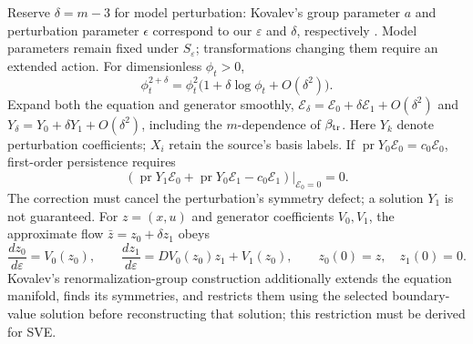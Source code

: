 \documentclass[11pt]{article}
\newcommand{\E}{\mathcal E}
\newcommand{\pr}{\operatorname{pr}}
\begin{document}
Reserve $\delta=m-3$ for model perturbation: Kovalev's group parameter $a$
and perturbation parameter $\epsilon$ correspond to our $\varepsilon$ and
$\delta$, respectively \cite{kovalev}. Model parameters remain fixed under
$S_\varepsilon$; transformations changing them require an extended action.
For dimensionless $\phi_t>0$,
\begin{equation}
\phi_t^{2+\delta}=\phi_t^2\bigl(1+\delta\log\phi_t+O(\delta^2)\bigr).
\end{equation}
Expand both the equation and generator smoothly,
$\E_\delta=\E_0+\delta\E_1+O(\delta^2)$ and
$Y_\delta=Y_0+\delta Y_1+O(\delta^2)$, including the $m$-dependence of
$\beta_{\rm tr}$.
Here $Y_k$ denote perturbation coefficients; $X_i$ retain the source's basis labels.
If $\pr Y_0\E_0=c_0\E_0$, first-order persistence requires
\begin{equation}
\left.(\pr Y_1\E_0+\pr Y_0\E_1-c_0\E_1)\right|_{\E_0=0}=0.
\end{equation}
The correction must cancel the perturbation's symmetry defect; a solution
$Y_1$ is not guaranteed. For $z=(x,u)$ and generator coefficients
$V_0,V_1$, the approximate flow $\bar z=z_0+\delta z_1$ obeys
\begin{equation}
\frac{dz_0}{d\varepsilon}=V_0(z_0),\qquad
\frac{dz_1}{d\varepsilon}=DV_0(z_0)z_1+V_1(z_0),\qquad
z_0(0)=z,\quad z_1(0)=0.
\end{equation}
Kovalev's renormalization-group construction additionally extends the
equation manifold, finds its symmetries, and restricts them using the selected
boundary-value solution before reconstructing that solution; this restriction
must be derived for SVE.
\end{document}
